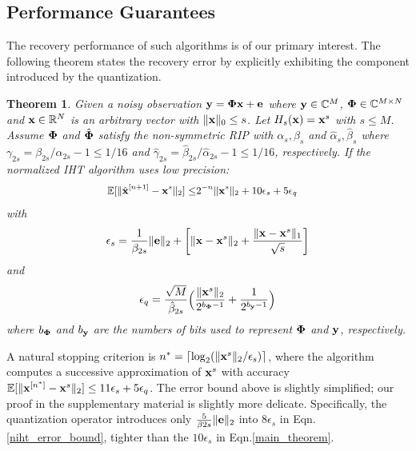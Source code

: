 \documentclass{article}
\newtheorem{theorem}{Theorem}
\begin{document}
\subsection{Performance Guarantees}
\vspace{-1em}
The recovery performance of such algorithms is of our primary interest. The following theorem states the recovery error by explicitly exhibiting the component introduced by the quantization.



\begin{theorem}\label{main_theorem_TH}
Given a noisy observation ${\bf y} = {\bf \Phi x}+{\bf e} $ where ${\bf y} \in \mathbb{C}^M$, ${\bf \Phi} \in \mathbb{C}^{M\times N}$ and ${\bf x} \in \mathbb{R}^N$ is an arbitrary vector with $\|{\bf x} \|_0 \leq s$. Let $H_s({\bf x}) = {\bf x}^s$ with $s\leq M$. Assume ${\bf \Phi}$ and $\hat{\bf \Phi}$ satisfy the non-symmetric RIP with ${\alpha}_s, {\beta}_s$ and $\hat{\alpha}_s, \hat{\beta}_s$ where ${\gamma}_{2s} = {\beta}_{2s}/{\alpha}_{2s} -1 \leq 1/16$ and $\hat{\gamma}_{2s} = \hat{\beta}_{2s}/\hat{\alpha}_{2s} -1 \leq 1/16$, respectively. If the normalized IHT algorithm uses low precision:
\begin{equation}\label{main_theorem}
\small
\begin{split}
        \mathbb{E}[\|\hat{{\bf x}}^{[n+1]}-{\bf x}^s\|_2]  
        \leq &2^{-n}\|{\bf x}^{s}\|_2  + 10 {\epsilon}_s + 5 {\epsilon}_q
\end{split}
\end{equation}
with 
\begin{equation}
\small
 {\epsilon}_s = \frac{1}{\beta_{2s}}\|{\bf e} \|_2 +\bigg  [ \|{\bf x}-{\bf x}^s \|_2 + \frac{\|{\bf x}-{\bf x}^s \|_1}{\sqrt{s}}\bigg]    
\end{equation}
and
\begin{equation}
\small
 {\epsilon}_q = \frac{\sqrt{M}}{\hat{\beta}_{2s}}\Big ( \frac{\| {\bf x}^s\|_2}{2^{b_{\bf \Phi}-1}}+\frac{1}{2^{b_{\bf y}-1}} \Big )
\end{equation}
where $b_{\bf \Phi}$ and $b_{\bf y}$ are the numbers of bits used to represent ${\bf \Phi}$ and ${\bf y}$, respectively.
\end{theorem}
A natural stopping criterion is $n^* = \lceil \log_2 (\|{\bf x}^s \|_2/\epsilon_s)\rceil$, where the algorithm computes a successive approximation of ${\bf x}^s$ with accuracy $\mathbb{E}[\|{\bf x}^{[n^*]}-{\bf x}^s \|_2] \leq 11\epsilon_s + 5\epsilon_q$.
The error bound above is slightly simplified; our proof in the supplementary material is slightly more delicate. Specifically, the quantization operator introduces only $\frac{5}{\beta
{2s}} \|{\bf e} \|_2$ into $8 {\epsilon}_s$ in Eqn.\ref{niht_error_bound}, tighter than the $10 {\epsilon}_s$ in Eqn.\ref{main_theorem}.
\end{document}
